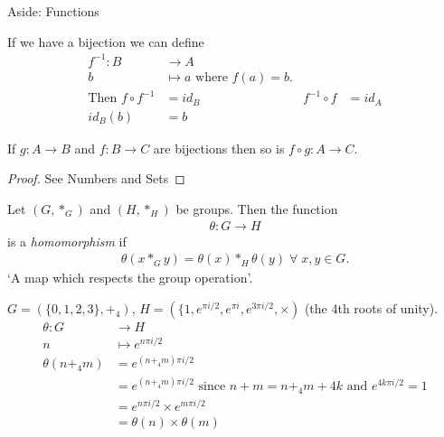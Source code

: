 \begin{aside}{Aside: Functions}
\begin{definition}
  If we have a bijection we can define
  \begin{align*}
      f^{-1}: B &\to A &&\\
      b &\mapsto a \text{ where } f(a) = b. &&\\
      \text{Then } f \circ f^{-1} &= id_B & f^{-1} \circ f &= id_A \\
      id_B(b) &= b
  \end{align*}
\end{definition} 

\begin{lemma}
\protect\hypertarget{lem:two}{}\label{lem:two}If $g: A \to B$ and $f: B \to C$ are bijections then so is $f \circ g: A \to C$.
\end{lemma}

\begin{proof}
See Numbers and Sets
\end{proof}

\end{aside}

\begin{definition}
\protect\hypertarget{def:homomorphism}{}\label{def:homomorphism}
Let $(G, *_G)$ and $(H, *_H)$ be groups. Then the function
\begin{align*}
    \theta : G \to H
\end{align*} is a \emph{homomorphism} if
\begin{align*}
    \theta(x *_G y) = \theta(x) *_H \theta(y) \; \forall \; x, y \in G.
\end{align*}
`A map which respects the group operation'.
\end{definition}

\begin{example}
\protect\hypertarget{exm:isomorphism}{}\label{exm:isomorphism}
$G = (\{ 0, 1, 2, 3 \}, +_4)$, $H = (\{1, e^{\pi i/2}, e^{\pi i}, e^{3\pi i/2}, \times)$ (the 4th roots of unity).
\begin{align*}
    \theta: G &\to H \\
    n &\mapsto e^{n \pi i /2} \\
    \theta(n +_4 m) &= e^{(n +_4 m) \pi i /2} \\
    &= e^{(n +_4 m) \pi i /2} \text{ since $n + m = n +_4 m + 4k$ and $e^{4k \pi i /2} = 1$} \\
    &= e^{n \pi i /2} \times e^{m \pi i /2} \\
    &= \theta(n) \times \theta(m)
\end{align*}
\end{example}

